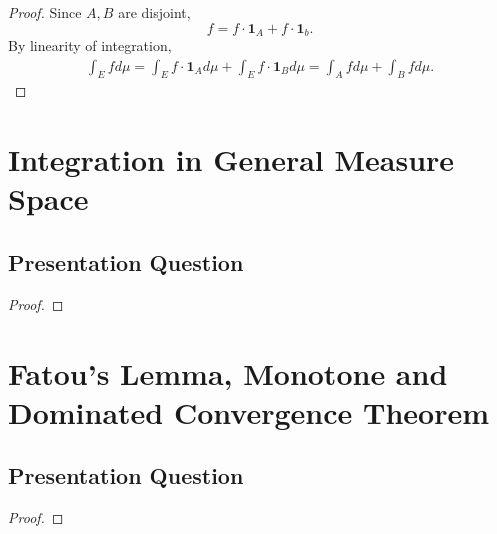 \documentclass[class=book, crop=false]{standalone}
\begin{document}
        \begin{proof}
            Since $A, B$ are disjoint,
            \begin{equation*}
                f = f \cdot \mathbf{1}_A + f \cdot \mathbf{1}_b.
            \end{equation*}
            By linearity of integration,
            \begin{align*}
                \int_E f d\mu = \int_E f \cdot \mathbf{1}_A d\mu + \int_E f \cdot \mathbf{1}_B d\mu = \int_A f d\mu + \int_B f d\mu.
            \end{align*}
        \end{proof}


    \section{Integration in General Measure Space}
        \subsection{Presentation Question}
        \begin{question}
            
        \end{question}
        \begin{proof}
            
        \end{proof}


    \section{Fatou’s Lemma, Monotone and Dominated Convergence Theorem}
        \subsection{Presentation Question}
        \begin{question}
            
        \end{question}
        \begin{proof}
            
        \end{proof}
\end{document}
